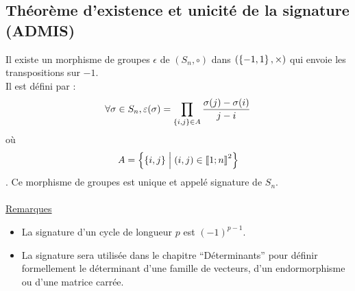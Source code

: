 \subsection{Théorème d’existence et unicité de la signature (ADMIS)}
\begin{theo}
    Il existe un morphisme de groupes \(\epsilon\) de \((S_n, \circ)\) dans \((\left\lbrace-1, 1\right\rbrace, \times)\) qui envoie les transpositions sur \(-1\).\\
    Il est défini par :
    \[\forall\sigma \in S_n, \varepsilon(\sigma) = \prod_{\left\lbrace i,j\right\rbrace\in A} \frac{\sigma(j) - \sigma(i)}{j - i}\]
    où
    \[A = \left\lbrace\left\lbrace i, j\right\rbrace \;\middle|\; (i, j) \in \left\llbracket1;n\right\rrbracket^2\right\rbrace\] .
    Ce morphisme de groupes est unique et appelé signature de \(S_n\).\\~\\
    \underline{Remarques}\\
    \begin{itemize}
        \item La signature d’un cycle de longueur \(p\) est \((-1)^{p-1}\).
        \item La signature sera utilisée dans le chapitre “Déterminants” pour définir formellement le déterminant d’une famille de vecteurs, d’un endormorphisme ou d’une matrice carrée.
    \end{itemize}
\end{theo}